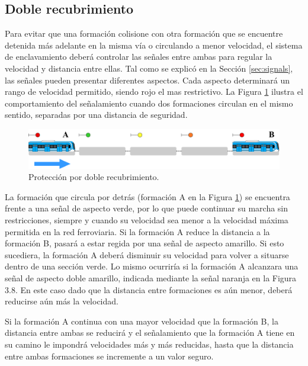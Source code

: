 \subsection{Doble recubrimiento}
	\label{sec:function_5}
	
	Para evitar que una formación colisione con otra formación que se encuentre detenida más adelante en la misma vía o circulando a menor velocidad, el sistema de enclavamiento deberá controlar las señales entre ambas para regular la velocidad y distancia entre ellas. Tal como se explicó en la Sección \ref{sec:signals}, las señales pueden presentar diferentes aspectos. Cada aspecto determinará un rango de velocidad permitido, siendo rojo el mas restrictivo. La Figura \ref{fig:ACG_recrubrimiento_1} ilustra el comportamiento del señalamiento cuando dos formaciones circulan en el mismo sentido, separadas por una distancia de seguridad.
	
	\begin{figure}[!h]
		\centering
		\includegraphics[width=1\textwidth]{Figuras/recubrimiento}
		\centering\caption{Protección por doble recubrimiento.}
		\label{fig:ACG_recrubrimiento_1}
	\end{figure}
	
	La formación que circula por detrás (formación A en la Figura \ref{fig:ACG_recrubrimiento_1}) se encuentra frente a una señal de aspecto verde, por lo
	que puede continuar su marcha sin restricciones, siempre y cuando su velocidad sea menor a la velocidad máxima permitida en la red ferroviaria. Si la formación A reduce la distancia a la formación B, pasará a estar regida por una señal de aspecto amarillo. Si esto sucediera, la formación A deberá disminuir su velocidad para volver a situarse dentro de una sección verde. Lo mismo ocurriría si la formación A alcanzara una señal de aspecto doble amarillo, indicada mediante la señal naranja en la Figura 3.8. En este caso dado que la distancia entre formaciones es aún menor, deberá reducirse aún más la velocidad.
	
	Si la formación A continua con una mayor velocidad que la formación B, la distancia entre ambas se reducirá y el señalamiento que la formación A tiene en su camino le impondrá velocidades más y más reducidas, hasta que la distancia entre ambas formaciones se incremente a un valor seguro.
		
